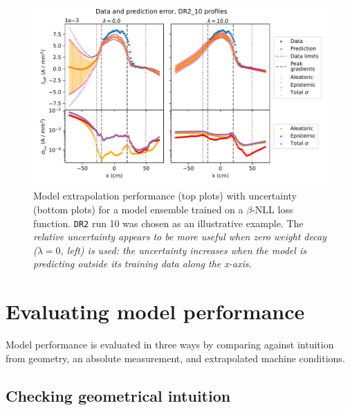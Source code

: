 \begin{figure}
	\centering
	\includegraphics[width=\linewidth]{figures/extrapolation-profile-variance_DR2_10_wd-comparison_two.pdf}
	\caption[size=12]{\label{fig:extrapolation-profile-var_two}Model extrapolation performance (top plots) with uncertainty (bottom plots) for a model ensemble trained on a $\beta$-NLL loss function. \texttt{DR2} run 10 was chosen as an illustrative example. The \em relative \em uncertainty appears to be more useful when zero weight decay ($\lambda = 0$, left) is used: the uncertainty increases when the model is predicting outside its training data along the x-axis.}
\end{figure}

\section{Evaluating model performance}
\label{sec:validation}

Model performance is evaluated in three ways by comparing against intuition from geometry, an absolute measurement, and extrapolated machine conditions. 


\subsection{Checking geometrical intuition}

